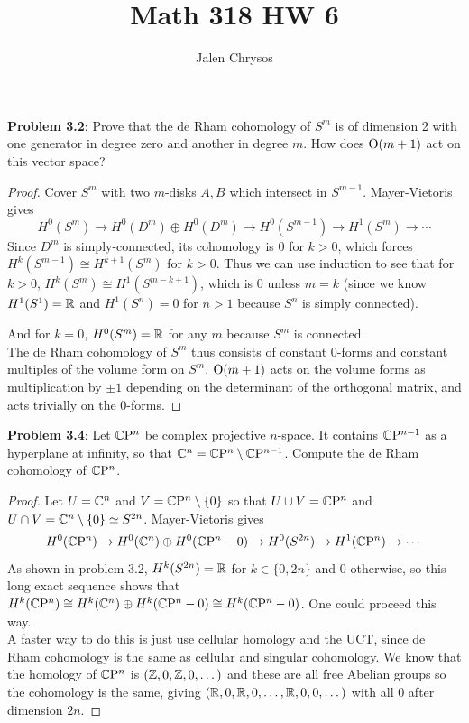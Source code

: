\documentclass{amsart}
\title{Math 318 HW 6}
\author{Jalen Chrysos}
\begin{document}
	\maketitle
	
	\textbf{Problem 3.2}: Prove that the de Rham cohomology of $S^m$ is of dimension 2 with one generator in degree zero and another in degree $m$. How does $\mathrm{O}(m+1)$ act on this vector space?\\
	
	\begin{proof}
		Cover $S^m$ with two $m$-disks $A,B$ which intersect in $S^{m-1}$. Mayer-Vietoris gives 
		$$
		H^0(S^m)\to H^0(D^m)\oplus H^0(D^m)\to H^0(S^{m-1})\to H^1(S^m)\to \cdots 
		$$
		Since $D^m$ is simply-connected, its cohomology is 0 for $k>0$, which forces $H^k(S^{m-1})\cong H^{k+1}(S^{m})$ for $k>0$. Thus we can use induction to see that for $k>0$, $H^k(S^m)\cong H^1(S^{m-k+1})$, which is 0 unless $m=k$ (since we know $H^1(S^1)=\mathbb{R}$ and $H^1(S^n)=0$ for $n>1$ because $S^n$ is simply connected).
		
		And for $k=0$, $H^0(S^m)=\mathbb{R}$ for any $m$ because $S^m$ is connected.\\
		
		
		The de Rham cohomology of $S^m$ thus consists of constant 0-forms and constant multiples of the volume form on $S^m$. $\mathrm{O}(m+1)$ acts on the volume forms as multiplication by $\pm 1$ depending on the determinant of the orthogonal matrix, and acts trivially on the 0-forms.
	\end{proof}
	
	\newpage 
	
	\textbf{Problem 3.4}: Let $\mathbb{C}\mathrm{P}^n$ be complex projective $n$-space. It contains $\mathbb{C}\mathrm{P}^{n-1}$ as a hyperplane at infinity, so that $\mathbb{C}^n=\mathbb{C}\mathrm{P}^n\setminus \mathbb{C}\mathrm{P}^{n-1}$. Compute the de Rham cohomology of $\mathbb{C}\mathrm{P}^n$.
	\begin{proof}
		Let $U= \mathbb{C}^n$ and $V=\mathbb{C}\mathrm{P}^n\setminus \{0\}$ so that $U\cup V = \mathbb{C}\mathrm{P}^n$ and $U\cap V = \mathbb{C}^n\setminus \{0\} \simeq S^{2n}$. Mayer-Vietoris gives
		$$
		H^0(\mathbb{C}\mathrm{P}^n)\to H^0(\mathbb{C}^n)\oplus H^0(\mathbb{C}\mathrm{P}^n-0)\to H^0(S^{2n})\to H^1(\mathbb{C}\mathrm{P}^n)\to \cdots
		$$
		As shown in problem 3.2, $H^k(S^{2n})=\mathbb{R}$ for $k\in \{0,2n\}$ and $0$ otherwise, so this long exact sequence shows that $H^k(\mathbb{C}\mathrm{P}^n)\cong H^k(\mathbb{C}^n)\oplus H^k(\mathbb{C}\mathrm{P}^n-0) \cong H^k(\mathbb{C}\mathrm{P}^n-0)$. One could proceed this way.\\
		
		A faster way to do this is just use cellular homology and the UCT, since de Rham cohomology is the same as cellular and singular cohomology. We know that the homology of $\mathbb{C}\mathrm{P}^n$ is $(\mathbb{Z},0,\mathbb{Z},0,\dots)$ and these are all free Abelian groups so the cohomology is the same, giving $(\mathbb{R},0,\mathbb{R},0,\dots,\mathbb{R},0,0,\dots)$ with all 0 after dimension $2n$.
	\end{proof}
	
\end{document}
